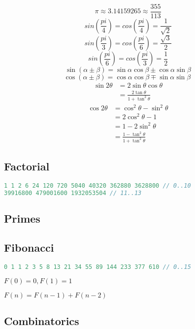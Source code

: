 \documentclass[a4paper,landscape,8pt]{article}
\begin{document}
\begin{multicols}{2}
\[
  \pi \approx 3.14159265 \approx \frac{355}{113}
\]
\[
  sin(\frac{pi}{4}) = cos(\frac{pi}{4}) = \frac{1}{\sqrt{2}}
\]
\[
  sin(\frac{pi}{3}) = cos(\frac{pi}{6}) = \frac{\sqrt{3}}{2}
\]
\[
  sin(\frac{pi}{6}) = cos(\frac{pi}{3}) = \frac{1}{2}
\]
\[
  \sin(\alpha \pm \beta) = \sin \alpha \cos \beta \pm \cos \alpha \sin \beta
\]
\[
  \cos(\alpha \pm \beta) = \cos \alpha \cos \beta \mp \sin \alpha \sin \beta\
\]
\begin{align*}
  \sin 2\theta &= 2 \sin \theta \cos \theta \\
               &= \frac{2 \tan \theta} {1 + \tan^2 \theta}
\end{align*}
\begin{align*}
  \cos 2\theta &= \cos^2 \theta - \sin^2 \theta \\
               &= 2 \cos^2 \theta - 1 \\
               &= 1 - 2 \sin^2 \theta \\
               &= \frac{1 - \tan^2 \theta} {1 + \tan^2 \theta}
\end{align*}

\subsection{Factorial}

\begin{lstlisting}[language=C++]
1 1 2 6 24 120 720 5040 40320 362880 3628800 // 0..10
39916800 479001600 1932053504 // 11..13
\end{lstlisting}

\subsection{Primes}



\subsection{Fibonacci}

\begin{lstlisting}[language=C++]
0 1 1 2 3 5 8 13 21 34 55 89 144 233 377 610 // 0..15
\end{lstlisting}

$F(0) = 0, F(1) = 1$

$F(n) = F(n - 1) + F(n - 2)$

\subsection{Combinatorics}


\end{multicols}
\end{document}
